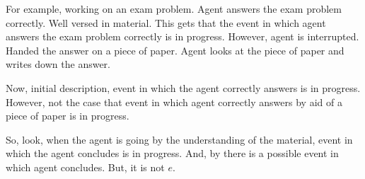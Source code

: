 \begin{note}
  For example, working on an exam problem.
  Agent answers the exam problem correctly.
  Well versed in material.
  This gets that the event in which agent answers the exam problem correctly is in progress.
  However, agent is interrupted.
  Handed the answer on a piece of paper.
  Agent looks at the piece of paper and writes down the answer.

  Now, initial description, event in which the agent correctly answers is in progress.
  However, not the case that event in which agent correctly answers by aid of a piece of paper is in progress.

  So, look, when the agent is going by the understanding of the material, event in which the agent concludes is in progress.
  And, by \assuPP{} there is a possible event in which agent concludes.
  But, it is not \(e\).
\end{note}




\section{}
\label{sec:what-these-do}


